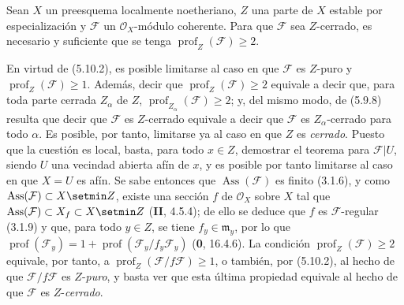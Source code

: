 \begin{theorem}[5.10.5]
Sean $X$ un preesquema localmente noetheriano, $Z$ una parte de $X$ estable
por especialización y $\mathcal F$ un $\mathcal O_X$-módulo coherente. Para que
$\mathcal F$ sea $Z$-cerrado, es necesario y suficiente que se tenga
$\operatorname{prof}_Z(\mathcal F)\geq2$.
\end{theorem}

En virtud de (5.10.2), es posible limitarse al caso en que $\mathcal F$ es
$Z$-puro y $\operatorname{prof}_Z(\mathcal F)\geq1$. Además, decir que
$\operatorname{prof}_Z(\mathcal F)\geq2$ equivale a decir que, para toda parte
cerrada $Z_\alpha$ de $Z$, $\operatorname{prof}_{Z_\alpha}(\mathcal F)\geq2$;
y, del mismo modo, de (5.9.8) resulta que decir que $\mathcal F$ es $Z$-cerrado
equivale a decir que $\mathcal F$ es $Z_\alpha$-cerrado para todo $\alpha$.
Es posible, por tanto, limitarse ya al caso en que $Z$ es \emph{cerrado}. Puesto que la
cuestión es local, basta, para todo $x\in Z$, demostrar el teorema para
$\mathcal F|U$, siendo $U$ una vecindad abierta afín de $x$, y es posible por tanto
limitarse al caso en que $X=U$ es afín. Se sabe entonces que
$\operatorname{Ass}(\mathcal F)$ es finito (3.1.6), y como
$\operatorname{Ass}(\mathcal F)\subset X\setmin Z$, existe una sección $f$ de
$\mathcal O_X$ sobre $X$ tal que
$\operatorname{Ass}(\mathcal F)\subset X_f\subset X\setmin Z$ (\textbf{II}, 4.5.4); de ello se
deduce que $f$ es $\mathcal F$-regular (3.1.9) y que, para todo $y\in Z$, se
tiene $f_y\in\mathfrak m_y$, por lo que
$\operatorname{prof}(\mathcal F_y)
=1+\operatorname{prof}(\mathcal F_y/f_y\mathcal F_y)$
(\textbf{0}, 16.4.6).
La condición $\operatorname{prof}_Z(\mathcal F)\geq2$ equivale, por tanto, a
$\operatorname{prof}_Z(\mathcal F/f\mathcal F)\geq1$, o también, por (5.10.2),
al hecho de que $\mathcal F/f\mathcal F$ es $Z$-\emph{puro}, y basta ver que esta
última propiedad equivale al hecho de que $\mathcal F$ es $Z$-\emph{cerrado}.

